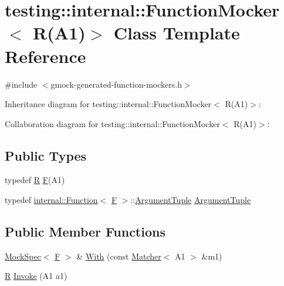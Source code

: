 \hypertarget{classtesting_1_1internal_1_1_function_mocker_3_01_r_07_a1_08_4}{}\section{testing\+:\+:internal\+:\+:Function\+Mocker$<$ R(A1)$>$ Class Template Reference}
\label{classtesting_1_1internal_1_1_function_mocker_3_01_r_07_a1_08_4}


{\ttfamily \#include $<$gmock-\/generated-\/function-\/mockers.\+h$>$}



Inheritance diagram for testing\+:\+:internal\+:\+:Function\+Mocker$<$ R(A1)$>$\+:


Collaboration diagram for testing\+:\+:internal\+:\+:Function\+Mocker$<$ R(A1)$>$\+:
\subsection*{Public Types}
\begin{DoxyCompactItemize}
\item 
typedef \hyperlink{typedefs__9_8js_afb423b73ee7b6c04d2d54fc06e405404}{R} \hyperlink{classtesting_1_1internal_1_1_function_mocker_3_01_r_07_a1_08_4_ada54286442ab14a18c2308cef748848f}{F}(A1)
\item 
typedef \hyperlink{structtesting_1_1internal_1_1_function}{internal\+::\+Function}$<$ \hyperlink{classtesting_1_1internal_1_1_function_mocker_3_01_r_07_a1_08_4_ada54286442ab14a18c2308cef748848f}{F} $>$\+::\hyperlink{classtesting_1_1internal_1_1_function_mocker_3_01_r_07_a1_08_4_aacec6412ac4343c071d7dfe965558b0b}{Argument\+Tuple} \hyperlink{classtesting_1_1internal_1_1_function_mocker_3_01_r_07_a1_08_4_aacec6412ac4343c071d7dfe965558b0b}{Argument\+Tuple}
\end{DoxyCompactItemize}
\subsection*{Public Member Functions}
\begin{DoxyCompactItemize}
\item 
\hyperlink{classtesting_1_1internal_1_1_mock_spec}{Mock\+Spec}$<$ \hyperlink{classtesting_1_1internal_1_1_function_mocker_3_01_r_07_a1_08_4_ada54286442ab14a18c2308cef748848f}{F} $>$ \& \hyperlink{classtesting_1_1internal_1_1_function_mocker_3_01_r_07_a1_08_4_aa61b5c24c52b8c49713774c49a01b26e}{With} (const \hyperlink{classtesting_1_1_matcher}{Matcher}$<$ A1 $>$ \&m1)
\item 
\hyperlink{typedefs__9_8js_afb423b73ee7b6c04d2d54fc06e405404}{R} \hyperlink{classtesting_1_1internal_1_1_function_mocker_3_01_r_07_a1_08_4_a4a58d37902572c8136d999c5008dce1a}{Invoke} (A1 a1)
\end{DoxyCompactItemize}
